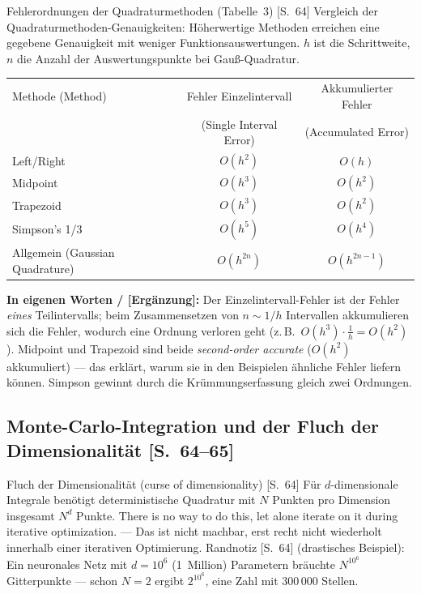 \begin{satzbox}{Fehlerordnungen der Quadraturmethoden (Tabelle~3) [S.~64]}
Vergleich der Quadraturmethoden-Genauigkeiten: Höherwertige Methoden erreichen eine
gegebene Genauigkeit mit weniger Funktionsauswertungen. $h$ ist die Schrittweite, $n$
die Anzahl der Auswertungspunkte bei Gau{\ss}-Quadratur.

\begin{center}
\begin{tabular}{lcc}
\toprule
Methode (Method) & Fehler Einzelintervall & Akkumulierter Fehler \\
 & (Single Interval Error) & (Accumulated Error) \\
\midrule
Left/Right & $O(h^2)$ & $O(h)$ \\
Midpoint & $O(h^3)$ & $O(h^2)$ \\
Trapezoid & $O(h^3)$ & $O(h^2)$ \\
Simpson's 1/3 & $O(h^5)$ & $O(h^4)$ \\
Allgemein (Gaussian Quadrature) & $O(h^{2n})$ & $O(h^{2n-1})$ \\
\bottomrule
\end{tabular}
\end{center}

\textbf{In eigenen Worten / [Ergänzung]:} Der Einzelintervall-Fehler ist der Fehler
\emph{eines} Teilintervalls; beim Zusammensetzen von $n \sim 1/h$ Intervallen
akkumulieren sich die Fehler, wodurch eine Ordnung verloren geht (z.\,B.\
$O(h^3) \cdot \frac{1}{h} = O(h^2)$). Midpoint und Trapezoid sind beide
\emph{second-order accurate} ($O(h^2)$ akkumuliert) --- das erklärt, warum sie in den
Beispielen ähnliche Fehler liefern können. Simpson gewinnt durch die
Krümmungserfassung gleich zwei Ordnungen.
\end{satzbox}

\subsection{Monte-Carlo-Integration und der Fluch der Dimensionalität [S.~64--65]}

\begin{defbox}{Fluch der Dimensionalität (curse of dimensionality) [S.~64]}
Für $d$-dimensionale Integrale benötigt deterministische Quadratur mit $N$ Punkten
pro Dimension insgesamt $N^d$ Punkte. \glqq There is no way to do this, let alone
iterate on it during iterative optimization.\grqq{} --- Das ist nicht machbar, erst
recht nicht wiederholt innerhalb einer iterativen Optimierung. Randnotiz [S.~64]
(drastisches Beispiel): Ein neuronales Netz mit $d = 10^6$ (1~Million) Parametern
bräuchte $N^{10^6}$ Gitterpunkte --- schon $N = 2$ ergibt $2^{10^6}$, eine Zahl mit
300\,000 Stellen.
\end{defbox}

